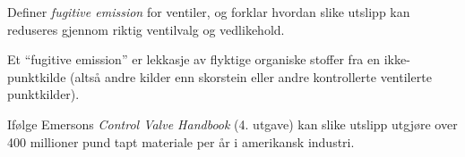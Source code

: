 

Definer {\it fugitive emission} for ventiler, og forklar hvordan slike utslipp kan reduseres gjennom riktig ventilvalg og vedlikehold.














Et ``fugitive emission'' er lekkasje av flyktige organiske stoffer fra en ikke-punktkilde (altså andre kilder enn skorstein eller andre kontrollerte ventilerte punktkilder).

Ifølge Emersons {\it Control Valve Handbook} (4. utgave) kan slike utslipp utgjøre over 400 millioner pund tapt materiale per år i amerikansk industri.



